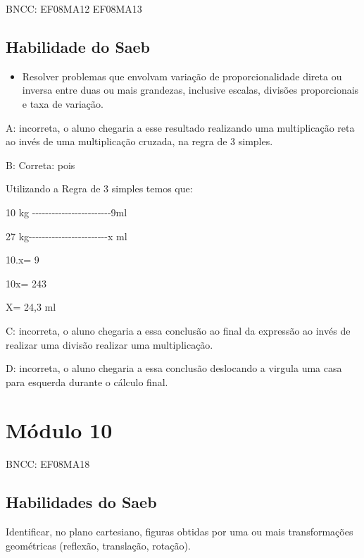BNCC: EF08MA12 EF08MA13

\section{Habilidade do Saeb}

\begin{itemize}
\tightlist

\item 
  Resolver problemas que envolvam variação de proporcionalidade direta
  ou inversa entre duas ou mais grandezas, inclusive escalas, divisões
  proporcionais e taxa de variação.
\end{itemize}

A: incorreta, o aluno chegaria a esse resultado realizando uma
multiplicação reta ao invés de uma multiplicação cruzada, na regra de 3
simples.

B: Correta: pois

Utilizando a Regra de 3 simples temos que:

10 kg
-\/-\/-\/-\/-\/-\/-\/-\/-\/-\/-\/-\/-\/-\/-\/-\/-\/-\/-\/-\/-\/-\/-\/-9ml

27
kg-\/-\/-\/-\/-\/-\/-\/-\/-\/-\/-\/-\/-\/-\/-\/-\/-\/-\/-\/-\/-\/-\/-\/-x
ml

10.x= 9

10x= 243

X= 24,3 ml

C: incorreta, o aluno chegaria a essa conclusão ao final da expressão ao
invés de realizar uma divisão realizar uma multiplicação.

D: incorreta, o aluno chegaria a essa conclusão deslocando a virgula uma
casa para esquerda durante o cálculo final.

\chapter{Módulo 10}

BNCC: EF08MA18

\section{Habilidades do Saeb}

Identificar, no plano cartesiano, figuras obtidas por uma ou mais
transformações geométricas (reflexão, translação, rotação).

